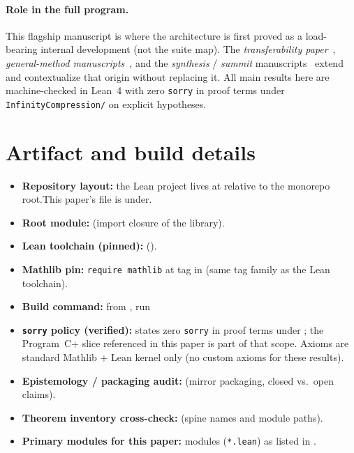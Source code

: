 \documentclass[11pt]{article}
\begin{document}
\paragraph{Role in the full program.}
This flagship manuscript is where the architecture is first proved as a load-bearing internal development (not the suite map). The \emph{transferability paper}~\cite{SpivackValidation}, \emph{general-method manuscripts}~\cite{SpivackFiber,SpivackQuillen}, and the \emph{synthesis} / \emph{summit} manuscripts~\cite{SpivackSynthesis,SpivackSummit} extend and contextualize that origin without replacing it. All main results here are machine-checked in Lean~4 with zero \texttt{sorry} in proof terms under \texttt{InfinityCompression/} on explicit hypotheses.

\appendix

\section{Artifact and build details}\label{app:artifact}
\begin{itemize}
    \item \textbf{Repository layout:} the Lean project lives at\linebreak{} relative to the  monorepo root.\linebreak This paper's  file is under\linebreak{}.
    \item \textbf{Root module:}  (import closure of the library).
    \item \textbf{Lean toolchain (pinned):}\linebreak{} ().
    \item \textbf{Mathlib pin:} \texttt{require mathlib} at tag  in  (same tag family as the Lean toolchain).
    \item \textbf{Build command:} from , run 
    \item \textbf{\texttt{sorry} policy (verified):}  states zero \texttt{sorry} in proof terms under ; the Program~C+ slice referenced in this paper is part of that scope. Axioms are standard Mathlib + Lean kernel only (no custom axioms for these results).
    \item \textbf{Epistemology / packaging audit:}\linebreak{} (mirror packaging, closed vs.\ open claims).
    \item \textbf{Theorem inventory cross-check:}\linebreak{} (spine names and module paths).
    \item \textbf{Primary modules for this paper:}  modules (\texttt{*.lean}) as listed in .
\end{itemize}
\end{document}
